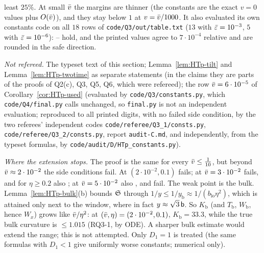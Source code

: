 \begin{remark}[Status]
\begin{itemize}
least $25\%$. At small $\bar v$ the margins are thinner (the constants are the exact $v=0$ values plus $O(\bar v)$), and they stay below $1$
at $v=\bar v/1000$. It also evaluated its own constants code on all $18$ rows of \texttt{code/Q3/out/table.txt} ($13$ with
$\bar\varepsilon=10^{-3}$, $5$ with $\bar\varepsilon=10^{-6}$): -- hold, and the printed values agree to $7\cdot10^{-4}$ relative and are
rounded in the safe direction.
\end{itemize}
\emph{Not refereed.} The typeset text of this section; Lemma~\ref{lem:HTp-tilt} and Lemma~\ref{lem:HTp-twotime} as separate statements (in
the claims they are parts of the proofs of Q2(c), Q3, Q5, Q6, which were refereed); the row $\bar v=6\cdot10^{-5}$ of
Corollary~\ref{cor:HTp-used} (evaluated by \texttt{code/Q3/constants.py}, which \texttt{code/Q4/final.py} calls unchanged, so
\texttt{final.py} is not an independent evaluation; reproduced to all printed digits, with no failed side condition, by the two
referees' independent codes \texttt{code/referee/Q3\_1/consts.py}, \texttt{code/referee/Q3\_2/consts.py}, report \texttt{audit-C.md},
and independently, from the typeset formulas, by \texttt{code/audit/D/HTp\_constants.py}).

\emph{Where the extension stops.} The proof is the same for every $\bar v\le\frac1{10}$, but beyond $\bar v\approx2\cdot10^{-2}$ the side
conditions fail. At $(2\cdot10^{-2},0.1)$  fails; at $\bar v=3\cdot10^{-2}$  fails, and for $\eta\ge0.2$ also ; at
$\bar v=5\cdot10^{-2}$ also ,  and  fail. The weak point is the bulk. Lemma~\ref{lem:HTp-bulk}(b) bounds $\mathfrak S$ through
$1/y\le1/y_{\mathrm b}\approx1/(b_{\mathrm{lo}}\eta^2)$, which is attained only next to the window, where in fact $y\approx\sqrt3\,\mathsf b$. So
$K_{\mathrm b}$ (and $T_{\mathrm b}$, $W_{\mathrm b}$, hence $W_x$) grows like $\bar v/\eta^2$: at $(\bar v,\eta)=(2\cdot10^{-2},0.1)$,
$K_{\mathrm b}=33.3$, while the true bulk curvature is $\le1.015$ (RQ3-1, by ODE). A sharper bulk estimate would extend the range; this is
not attempted. Only $D_1=1$ is treated (the same formulas with $D_1<1$ give uniformly worse constants; numerical only).
\end{remark}
